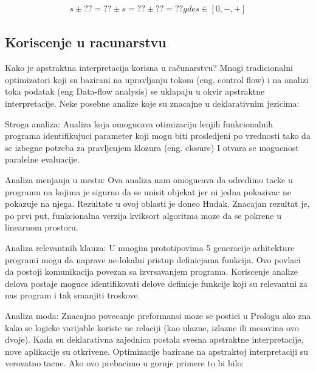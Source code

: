 \begin{multline}	
	s \pm ?? = ?? \pm s = ?? \pm ?? = ??    gde s \in [0, -, +]
\end{multline}


\subsection{Koriscenje u racunarstvu}
\label{subsec:problem1}
Kako je apstraktna interpretacija korisna u računarstvu? Mnogi tradicionalni optimizatori koji su bazirani na upravljanju tokom (eng. control flow) i na analizi toka podatak (eng Data-flow analysis) se uklapaju u okvir apstraktne interpretacije. Neke posebne analize koje su znacajne u deklarativnim jezicima:

Stroga analiza:
Analiza koja omogucava otimizaciju lenjih  funkcionalnih programa identifikujuci parameter koji mogu biti prosledjeni po vrednosti tako da se izbegne potreba za pravljenjem klozura (eng. closure) I otvara se mogucnost paralelne evaluacije. 

Analiza menjanja u mestu:
Ova analiza nam omogucava da odredimo tacke u programu na kojima je sigurno da se unisit objekat jer ni jedna pokazivac ne pokazuje na njega. Rezultate u ovoj oblasti je doneo Hudak. Znacajan rezultat je, po prvi put, funkcionalna verzija kviksort algoritma moze da se pokrene u linearnom prostoru. \cite{Girard1987}

Analiza relevantnih klauza:
U mnogim prototipovima 5 generacije arhitekture programi mogu da naprave ne-lokalni pristup definicjama funkcija. Ovo povlaci da postoji komunikacija povezan sa izvrsavanjem programa. Koriscenje analize delova postaje moguce identifikovati delove definicje funkcije koji su relevantni za nas program i tak smanjiti troskove.  

Analiza moda:
Znacajno povecanje preformansi moze se postici u Prologu ako zna kako se logicke varijable koriste ue relaciji (kao ulazne, izlazne ili mesavina ovo dvoje).
Kada su deklarativna zajednica postala svesna apstraktne interpretacije, nove aplikacije su otkrivene. Optimizacije bazirane na apstraktoj interpretaciji su verovatno tacne. Ako ovo prebacimo u gornje primere to bi bilo:


